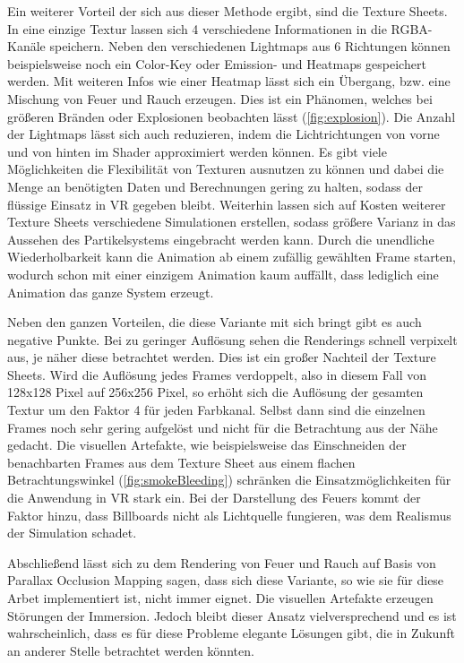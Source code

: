 Ein weiterer Vorteil der sich aus dieser Methode ergibt, sind die Texture Sheets. In eine einzige Textur lassen sich 4 verschiedene Informationen in die
RGBA-Kanäle speichern. Neben den verschiedenen Lightmaps aus 6 Richtungen können beispielsweise noch ein Color-Key oder Emission- und Heatmaps gespeichert werden.
Mit weiteren Infos wie einer Heatmap lässt sich ein Übergang, bzw. eine Mischung von Feuer und Rauch erzeugen. Dies ist ein Phänomen, welches bei größeren Bränden
oder Explosionen beobachten lässt (\autoref{fig:explosion}).
Die Anzahl der Lightmaps lässt sich auch reduzieren, indem die Lichtrichtungen von vorne und von hinten im Shader approximiert werden können.
Es gibt viele Möglichkeiten die Flexibilität von Texturen ausnutzen zu können und dabei die Menge an benötigten Daten und Berechnungen gering zu halten,
sodass der flüssige Einsatz in VR gegeben bleibt. Weiterhin lassen sich auf Kosten weiterer Texture Sheets
verschiedene Simulationen erstellen, sodass größere Varianz in das Aussehen des Partikelsystems eingebracht werden kann.
Durch die unendliche Wiederholbarkeit kann die Animation ab einem zufällig gewählten Frame starten, wodurch schon mit einer einzigem Animation
kaum auffällt, dass lediglich eine Animation das ganze System erzeugt.


Neben den ganzen Vorteilen, die diese Variante mit sich bringt gibt es auch negative Punkte. Bei zu geringer Auflösung sehen die Renderings schnell
verpixelt aus, je näher diese betrachtet werden. Dies ist ein großer Nachteil der Texture Sheets. Wird die Auflösung jedes Frames verdoppelt, also in diesem
Fall von 128x128 Pixel auf 256x256 Pixel, so erhöht sich die Auflösung der gesamten Textur um den Faktor 4 für jeden Farbkanal. Selbst dann sind
die einzelnen Frames noch sehr gering aufgelöst und nicht für die Betrachtung aus der Nähe gedacht.
Die visuellen Artefakte, wie beispielsweise das Einschneiden der benachbarten Frames aus dem Texture Sheet aus einem flachen Betrachtungswinkel (\autoref{fig:smokeBleeding})
schränken die Einsatzmöglichkeiten für die Anwendung in VR stark ein.
Bei der Darstellung des Feuers kommt der Faktor hinzu, dass Billboards nicht als Lichtquelle fungieren, was dem Realismus der Simulation schadet.

Abschließend lässt sich zu dem Rendering von Feuer und Rauch auf Basis von Parallax Occlusion Mapping sagen, dass sich diese Variante, so wie sie für diese Arbet
implementiert ist, nicht immer eignet. Die visuellen Artefakte erzeugen Störungen der Immersion. Jedoch bleibt dieser Ansatz vielversprechend und es ist wahrscheinlich, 
dass es für diese Probleme elegante Lösungen gibt, die in Zukunft an anderer Stelle betrachtet werden könnten.



